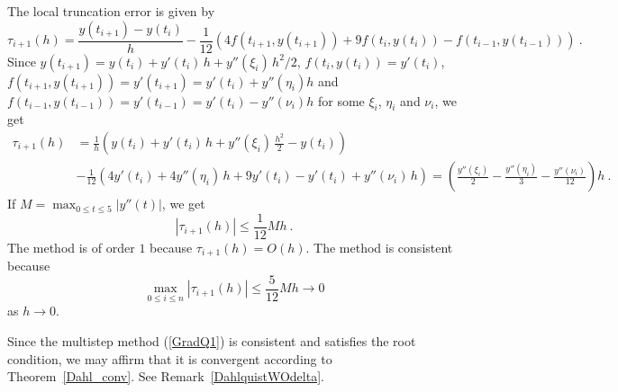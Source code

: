 { The local truncation error is given by 
\[
\tau_{i+1}(h) = \frac{y(t_{i+1}) - y(t_i)}{h} - \frac{1}{12}
\left( 4 f(t_{i+1},y(t_{i+1})) + 9f(t_i,y(t_i)) -f(t_{i-1},y(t_{i-1}))
\right) \ .
\]
Since
$y(t_{i+1}) = y(t_i) + y'(t_i)\,h + y''(\xi_i)\,h^2/2$,
$f(t_i,y(t_i)) = y'(t_i)$,
$f(t_{i+1},y(t_{i+1})) = y'(t_{i+1}) = y'(t_i) + y''(\eta_i) h$ and
$f(t_{i-1},y(t_{i-1})) = y'(t_{i-1}) = y'(t_i) - y''(\nu_i) h$
for some $\xi_i$, $\eta_i$ and $\nu_i$, we get
\begin{align*}
\tau_{i+1}(h) &= \frac{1}{h}
\left(y(t_i) + y'(t_i)\,h + y''(\xi_i)\,\frac{h^2}{2} - y(t_i) \right) \\
&- \frac{1}{12}
\left(4y'(t_i) + 4y''(\eta_i)\,h + 9 y'(t_i) - y'(t_i) + y''(\nu_i)\,h \right)
= \left( \frac{y''(\xi_i)}{2}
- \frac{y''(\eta_i)}{3} - \frac{y''(\nu_i)}{12}\right)h \ .
\end{align*}
If $\displaystyle M= \max_{0 \leq t \leq 5} | y''(t) |$, we get
\[
| \tau_{i+1}(h) | \leq \frac{1}{12} M h \ .
\]
The method is of order $1$ because $\tau_{i+1}(h) = O(h)$.
The method is consistent because
\[
\max_{0\leq i \leq n} | \tau_{i+1}(h) | \leq \frac{5}{12} M h
\rightarrow 0
\]
as $h\rightarrow 0$.

Since the multistep method (\ref{GradQ1}) is consistent and satisfies
the root condition, we may affirm that it is convergent according to
Theorem~\ref{Dahl_conv}.  See Remark~\ref{DahlquistWOdelta}.
}

